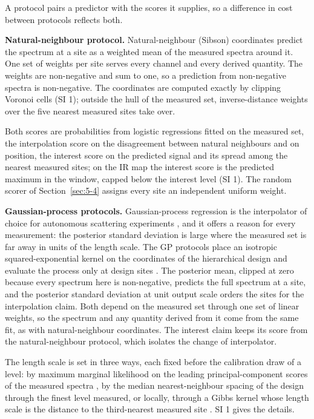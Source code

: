 \documentclass{iopjournal}
\begin{document}
A protocol pairs a predictor with the scores it supplies, so a difference in cost between protocols reflects both.

\textbf{Natural-neighbour protocol.} Natural-neighbour (Sibson) coordinates \cite{Sibson1981} predict the spectrum at a site as a weighted mean of the measured spectra around it. One set of weights per site serves every channel and every derived quantity. The weights are non-negative and sum to one, so a prediction from non-negative spectra is non-negative. The coordinates are computed exactly by clipping Voronoi cells (SI 1); outside the hull of the measured set, inverse-distance weights over the five nearest measured sites take over.

Both scores are probabilities from logistic regressions fitted on the measured set, the interpolation score on the disagreement between natural neighbours and on position, the interest score on the predicted signal and its spread among the nearest measured sites; on the IR map the interest score is the predicted maximum in the window, capped below the interest level (SI 1). The random scorer of Section~\ref{sec:5-4} assigns every site an independent uniform weight.

\textbf{Gaussian-process protocols.} Gaussian-process regression is the interpolator of choice for autonomous scattering experiments \cite{Noack2019,Noack2020}, and it offers a reason for every measurement: the posterior standard deviation is large where the measured set is far away in units of the length scale. The GP protocols place an isotropic squared-exponential kernel on the coordinates of the hierarchical design and evaluate the process only at design sites \cite{RasmussenWilliams2006}. The posterior mean, clipped at zero because every spectrum here is non-negative, predicts the full spectrum at a site, and the posterior standard deviation at unit output scale orders the sites for the interpolation claim. Both depend on the measured set through one set of linear weights, so the spectrum and any quantity derived from it come from the same fit, as with natural-neighbour coordinates. The interest claim keeps its score from the natural-neighbour protocol, which isolates the change of interpolator.

The length scale is set in three ways, each fixed before the calibration draw of a level: by maximum marginal likelihood on the leading principal-component scores of the measured spectra \cite{Balandat2020}, by the median nearest-neighbour spacing of the design through the finest level measured, or locally, through a Gibbs kernel whose length scale is the distance to the third-nearest measured site \cite{Gibbs1997,PaciorekSchervish2004}. SI 1 gives the details.
\end{document}
